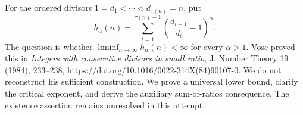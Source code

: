 For the ordered divisors $1=d_1<\cdots<d_{\tau(n)}=n$, put
\[
 h_\alpha(n)=\sum_{i=1}^{\tau(n)-1}\left(\frac{d_{i+1}}{d_i}-1\right)^\alpha.
\]
The question is whether $\liminf_{n\to\infty}h_\alpha(n)<\infty$ for every $\alpha>1$. Vose proved this in \emph{Integers with consecutive divisors in small ratio}, J. Number Theory 19 (1984), 233--238, \url{https://doi.org/10.1016/0022-314X(84)90107-0}. We do not reconstruct his sufficient construction. We prove a universal lower bound, clarify the critical exponent, and derive the auxiliary sum-of-ratios consequence. The existence assertion remains unresolved in this attempt.
